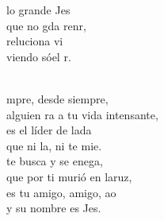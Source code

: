 \documentclass[12pt]{article}
\begin{document}
\begin{multicols*}{2}
\begin{cancion}
	 lo grande Jes  \\
	 que no gda renr,\\
	reluciona  vi\\
	viendo sóel r.\\\jump\\
	\begin{chorus}%
	mpre, desde siempre,\\
	alguien ra a tu vida intensante,\\
	es el líder de lada\\
	que ni la, ni te mie.\\
	 te busca y se enega,\\
	que por ti murió en laruz,\\
	es tu amigo, amigo, ao\\
	y su nombre es Jes.\\
	\end{chorus}%
	\jump\\
	       \\
\end{cancion}%


\end{multicols*}
\end{document}
